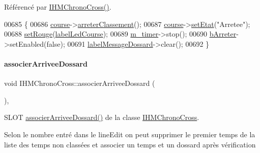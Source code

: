 Référencé par \hyperlink{class_i_h_m_chrono_cross_a479fc90733fba3e65fb06aa4a3adc02e}{I\+H\+M\+Chrono\+Cross()}.


\begin{DoxyCode}
00685 \{
00686    \hyperlink{class_i_h_m_chrono_cross_a03a8226c0e7f423d29302d9a06284ab4}{course}->\hyperlink{class_course_a4426310a411d8ecf7f4a2dc64c24a42d}{arreterClassement}();
00687    \hyperlink{class_i_h_m_chrono_cross_a03a8226c0e7f423d29302d9a06284ab4}{course}->\hyperlink{class_course_a3ebcde1fa443cb20d71fb98af4d0c418}{setEtat}(\textcolor{stringliteral}{"Arretee"});
00688    \hyperlink{class_i_h_m_chrono_cross_a3b46a31326bdde2b5ad67a9f0a6de76b}{setRouge}(\hyperlink{class_i_h_m_chrono_cross_a8568c80f2e2ffe96c81d2a94a2146159}{labelLedCourse});
00689    \hyperlink{class_i_h_m_chrono_cross_ad29ebde513a6e722cf87aa06e767416a}{m\_timer}->stop();
00690    \hyperlink{class_i_h_m_chrono_cross_a75ce4fcdab11095834fe3f9e931f8964}{bArreter}->setEnabled(\textcolor{keyword}{false});
00691    \hyperlink{class_i_h_m_chrono_cross_abd23647486d38e6f57aef1faf50757af}{labelMessageDossard}->clear();
00692 \}
\end{DoxyCode}
\mbox{\label{class_i_h_m_chrono_cross_a9f7f1ad130b60300a879694b6234f161}} 
\paragraph{\texorpdfstring{associer\+Arrivee\+Dossard}{associerArriveeDossard}}
{\footnotesize\ttfamily void I\+H\+M\+Chrono\+Cross\+::associer\+Arrivee\+Dossard (\begin{DoxyParamCaption}{ }\end{DoxyParamCaption})\hspace{0.3cm}{\ttfamily [private]}, {\ttfamily [slot]}}



S\+L\+OT \hyperlink{class_i_h_m_chrono_cross_a9f7f1ad130b60300a879694b6234f161}{associer\+Arrivee\+Dossard()} de la classe \hyperlink{class_i_h_m_chrono_cross}{I\+H\+M\+Chrono\+Cross}. 

Selon le nombre entré dans le line\+Edit on peut supprimer le premier temps de la liste des temps non classées et associer un temps et un dossard après vérification 

